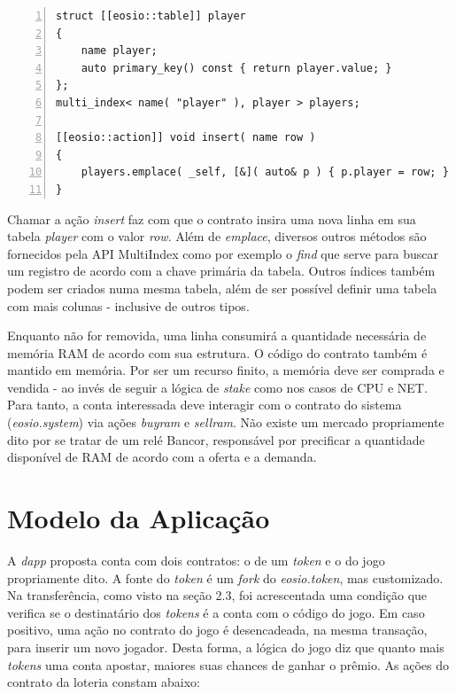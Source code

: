 \documentclass[a4paper,12pt]{monografia}
\theoremstyle{plain}
\theoremstyle{definition}
\theoremstyle{remark}
\begin{document}
\lstset{tabsize=5,language=C++,showstringspaces=false,basicstyle=\ttfamily\small,keywordstyle=\bf,breaklines=true}
\begin{singlespacing}
\begin{lstlisting}[frame=single,framexrightmargin=1pt,numbers=left]
struct [[eosio::table]] player
{
    name player;
    auto primary_key() const { return player.value; }
};
multi_index< name( "player" ), player > players;

[[eosio::action]] void insert( name row )
{
    players.emplace( _self, [&]( auto& p ) { p.player = row; } );
}
\end{lstlisting}
\end{singlespacing}

Chamar a a\c{c}\~ao \textit{insert} faz com que o contrato insira uma nova linha em sua tabela \textit{player} com o valor \textit{row}.
Al\'em de \textit{emplace}, diversos outros m\'etodos s\~ao fornecidos pela API MultiIndex como por exemplo o \textit{find} que serve para buscar um registro de acordo com a chave prim\'aria da tabela.
Outros \'indices tamb\'em podem ser criados numa mesma tabela, al\'em de ser poss\'ivel definir uma tabela com mais colunas - inclusive de outros tipos.

Enquanto n\~ao for removida, uma linha consumir\'a a quantidade necess\'aria de mem\'oria RAM de acordo com sua estrutura.
O c\'odigo do contrato tamb\'em \'e mantido em mem\'oria.
Por ser um recurso finito, a mem\'oria deve ser comprada e vendida - ao inv\'es de seguir a l\'ogica de \textit{stake} como nos casos de CPU e NET.
Para tanto, a conta interessada deve interagir com o contrato do sistema (\textit{eosio.system}) via a\c{c}\~oes \textit{buyram} e \textit{sellram}.
N\~ao existe um mercado propriamente dito por se tratar de um rel\'e Bancor, respons\'avel por precificar a quantidade dispon\'ivel de RAM de acordo com a oferta e a demanda.

\section{Modelo da Aplica\c{c}\~{a}o}

A \textit{dapp} proposta conta com dois contratos: o de um \textit{token} e o do jogo propriamente dito.
A fonte do \textit{token} \'e um \textit{fork} do \textit{eosio.token}, mas customizado.
Na transfer\^encia, como visto na se\c{c}\~ao 2.3, foi acrescentada uma condi\c{c}\~ao que verifica se o destinat\'ario dos \textit{tokens} \'e a conta com o c\'odigo do jogo.
Em caso positivo, uma a\c{c}\~ao no contrato do jogo \'e desencadeada, na mesma transa\c{c}\~ao, para inserir um novo jogador.
Desta forma, a l\'ogica do jogo diz que quanto mais \textit{tokens} uma conta apostar, maiores suas chances de ganhar o pr\^emio.
As a\c{c}\~oes do contrato da loteria constam abaixo:
\end{document}
